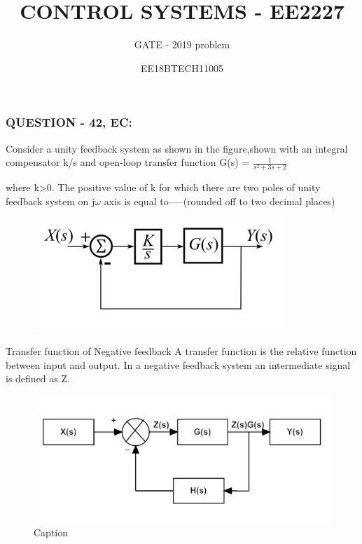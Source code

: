 \documentclass{beamer}
\author{EE18BTECH11005}
\title{CONTROL SYSTEMS - EE2227}
\subtitle{GATE - 2019 problem}
\institute{B.VARUNI}
\date{}
\begin{document}
\begin{frame}
	\titlepage
\end{frame}
\begin{frame}
     \frametitle{\textbf{QUESTION - 42, EC:}}
     {Consider a unity feedback system as shown in the figure,shown with an integral compensator k/s and open-loop transfer function} 
     \newline
    \newline G(s) = $\frac{1}{s^2+3s+2}$
   
    \newline
   
    where k>0. The positive value of k for which there are two poles of unity feedback system on j${\omega}$ {axis is equal to-----(rounded off to two decimal places)}
\end{frame}
\begin{frame}
 \begin{figure}
     \includegraphics[width=\linewidth]{gate.png}
    \end{figure}
\end{frame}
\begin{frame}{Transfer function of Negative feedback}
A transfer function is the relative function between input and output.
\newline In a negative feedback system an intermediate signal is defined as Z.
\begin{figure}
    \centering
    \includegraphics[width =\linewidth]{feedback.png}
    \caption{Caption}
    \label{fig:my_label}
\end{figure}
\end{frame}
\end{document}

